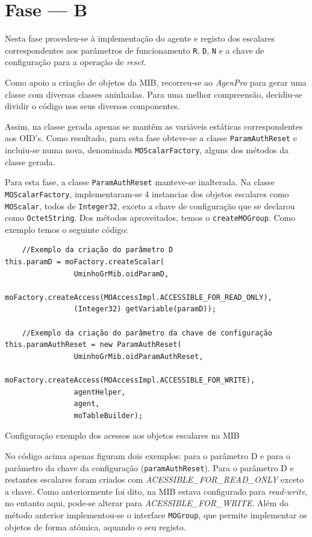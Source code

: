 \section{Fase --- B}


Nesta fase procedeu-se à implementação do agente e registo dos escalares
correspondentes aos parâmetros de funcionamento \texttt{R}, \texttt{D},
\texttt{N} e a chave de configuração para a operação de \emph{reset}.

Como apoio a criação de objetos da MIB, recorreu-se ao \emph{AgenPro} para gerar
uma classe com diversas classes aninhadas. Para uma melhor compreensão,
decidiu-se dividir o código nos seus diversos componentes.

Assim, na classe gerada apenas se mantêm as variáveis estáticas correspondentes
aos OID's. Como resultado, para esta fase obteve-se a classe
\texttt{ParamAuthReset} e incluiu-se numa nova, denominada
\texttt{MOScalarFactory}, alguns dos métodos da classe gerada.

Para esta fase, a classe \texttt{ParamAuthReset} manteve-se inalterada. Na
classe \texttt{MOScalarFactory}, implementaram-se 4 instancias dos objetos
escalares como \texttt{MOScalar}, todos de \texttt{Integer32}, exceto a chave de
configuração que se declarou como \texttt{OctetString}.  Dos métodos
aproveitados, temos o \texttt{createMOGroup}. Como exemplo temos o seguinte
código:


\begin{center}
\begin{verbatim}
	//Exemplo da criação do parâmetro D
this.paramD = moFactory.createScalar(
				UminhoGrMib.oidParamD,
				moFactory.createAccess(MOAccessImpl.ACCESSIBLE_FOR_READ_ONLY), 
				(Integer32) getVariable(paramD));

	//Exemplo da criação do parâmetro da chave de configuração
this.paramAuthReset = new ParamAuthReset(
				UminhoGrMib.oidParamAuthReset,
				moFactory.createAccess(MOAccessImpl.ACCESSIBLE_FOR_WRITE), 
				agentHelper, 
				agent,
				moTableBuilder);
\end{verbatim}
 	\captionsetup{type=figure, width=0.8\linewidth}
	\caption{Configuração exemplo dos acessos aos objetos escalares na MIB}
\label{fig:faseb:} 
\end{center}


No código acima apenas figuram dois exemplos: para o parâmetro D e para
o parâmetro da chave da configuração (\texttt{paramAuthReset}). Para o parâmetro
D e restantes escalares foram criados com \emph{ACESSIBLE\_FOR\_READ\_ONLY}
exceto a chave. Como anteriormente foi dito, na MIB estava configurado para
\emph{read-write}, no entanto aqui, pode-se alterar para
\emph{ACESSIBLE\_FOR\_WRITE}. Além do método anterior implementou-se o interface
\texttt{MOGroup}, que permite implementar os objetos de forma atómica, aquando
o seu registo.


